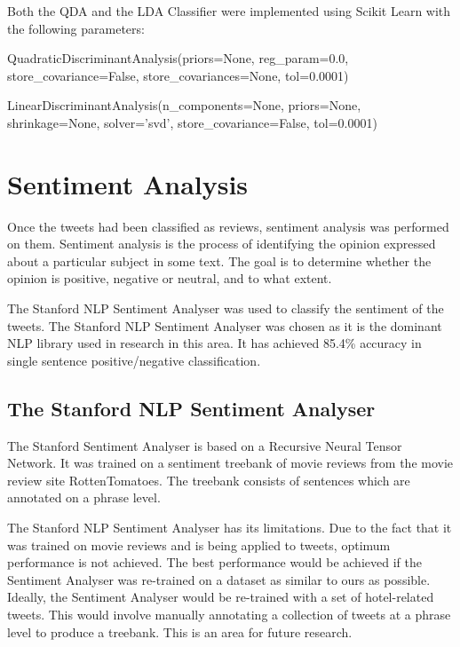 Both the QDA and the LDA Classifier were implemented using Scikit Learn with the following parameters:

\begin{tcolorbox}
\begin{center}
	QuadraticDiscriminantAnalysis(priors=None, reg\_param=0.0, store\_covariance=False, store\_covariances=None, tol=0.0001)
\end{center}
\end{tcolorbox}

\begin{tcolorbox}
\begin{center}
	LinearDiscriminantAnalysis(n\_components=None, priors=None, shrinkage=None, solver='svd', store\_covariance=False, tol=0.0001)
\end{center}
\end{tcolorbox}


\section{Sentiment Analysis}

Once the tweets had been classified as reviews, sentiment analysis was performed on them. Sentiment analysis is the process of identifying the opinion expressed about a particular subject in some text. The goal is to determine whether the opinion is positive, negative or neutral, and to what extent. 

The Stanford NLP Sentiment Analyser \cite{stanfordSentiment2013} was used to classify the sentiment of the tweets. The Stanford NLP Sentiment Analyser was chosen as it is the dominant NLP library used in research in this area. It has achieved 85.4\% accuracy in single sentence positive/negative classification. 

\subsection{The Stanford NLP Sentiment Analyser}

The Stanford Sentiment Analyser is based on a Recursive Neural Tensor Network. It was trained on a sentiment treebank of movie reviews from the movie review site RottenTomatoes. The treebank consists of sentences which are annotated on a phrase level. 

The Stanford NLP Sentiment Analyser has its limitations. Due to the fact that it was trained on movie reviews and is being applied to tweets, optimum performance is not achieved. The best performance would be achieved if the Sentiment Analyser was re-trained on a dataset as similar to ours as possible. Ideally, the Sentiment Analyser would be re-trained with a set of hotel-related tweets. This would involve manually annotating a collection of tweets at a phrase level to produce a treebank. This is an area for future research.

